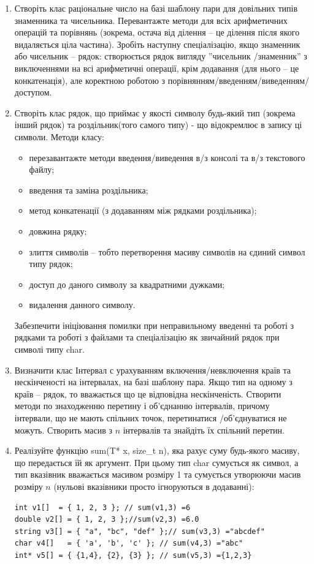 \documentclass[a5paper,titlepage,openany,twoside,
]
{book_unv}%
\begin{document}
\begin{enumerate}
\item
Створіть клас раціональне число на базі шаблону пари для довільних типів знаменника та чисельника.
Перевантажте методи для всіх арифметичних операцій та порівнянь
(зокрема, остача від ділення -- це ділення після якого видаляється ціла частина).
Зробіть наступну спеціалізацію, якщо знаменник або чисельник -- рядок:
створюється рядок вигляду ''{чисельник} /{знаменник}'' з виключеннями на всі арифметичні операції,
крім додавання (для нього -- це конкатенація), але коректною роботою з
порівнянням/введенням/виведенням/доступом.

\item
Створіть клас рядок, що приймає у якості символу будь-який тип (зокрема інший рядок)
та роздільник(того самого типу) - що відокремлює в запису ці символи.
Методи класу:
\begin{itemize}
\item
перезавантажте методи введення/виведення в/з консолі та в/з текстового файлу;
\item
введення та заміна роздільника;
\item
метод конкатенації (з додаванням між рядками роздільника);
\item
довжина рядку;
\item
злиття символів -- тобто перетворення масиву символів на єдиний символ типу рядок;
\item
доступ до даного символу за квадратними дужками;
\item
видалення данного символу.
\end{itemize}
Забезпечити ініціювання помилки при неправильному введенні та роботі з рядками
та роботі з файлами та спеціалізацію як звичайний рядок при символі типу char.

\item
Визначити клас Інтервал с урахуванням включення/невключення країв та нескінченості на інтервалах,
на базі шаблону пара. Якщо тип на одному з країв -- рядок, то вважається
що це відповідна нескінченість.  
Створити методи по знаходженню перетину і об'єднанню інтервалів,
причому інтервали, що не мають спільних точок, перетинатися /об'єднуватися не можуть.
Створить масив з $n$ інтервалів та знайдіть їх спільний перетин.
 
\item
Реалізуйте функцію sum(T* x, size\_t n), яка рахує суму будь-якого масиву, що передається їй як аргумент.
При цьому тип char сумується як символ, а тип вказівник вважається масивом розміру 1 та сумується утворюючи
масив розміру $n$ (нульові вказівники просто ігноруються в додаванні):
\begin{verbatim}
int v1[]  = { 1, 2, 3 }; // sum(v1,3) =6
double v2[] = { 1, 2, 3 };//sum(v2,3) =6.0
string v3[] = { "a", "bc", "def" };// sum(v3,3) ="abcdef"
char v4[]   = { 'a', 'b', 'c' }; // sum(v4,3) ="abc"
int* v5[] = { {1,4}, {2}, {3} }; // sum(v5,3) ={1,2,3}
\end{verbatim}


\end{enumerate}
\end{document}
